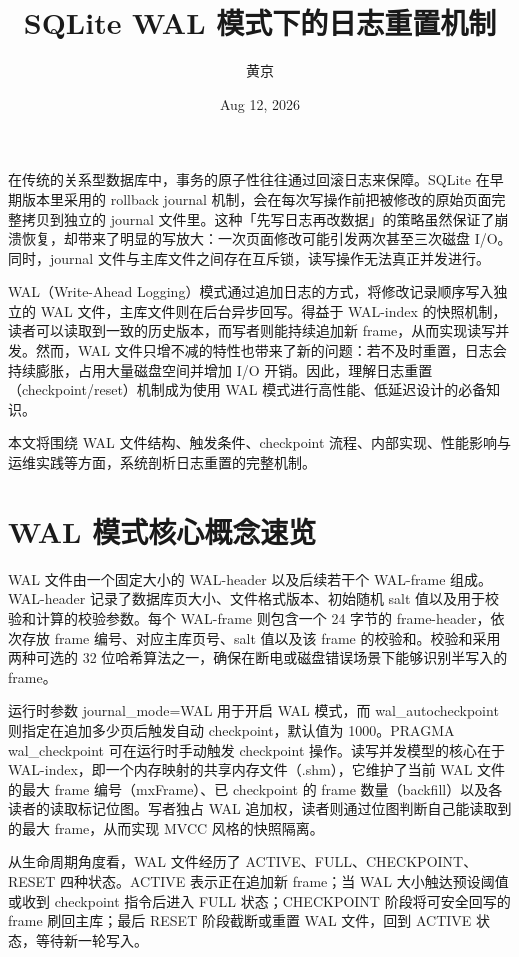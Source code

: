 \title{SQLite WAL 模式下的日志重置机制}
\author{黄京}
\date{Aug 12, 2026}
\maketitle
在传统的关系型数据库中，事务的原子性往往通过回滚日志来保障。SQLite 在早期版本里采用的 rollback journal 机制，会在每次写操作前把被修改的原始页面完整拷贝到独立的 journal 文件里。这种「先写日志再改数据」的策略虽然保证了崩溃恢复，却带来了明显的写放大：一次页面修改可能引发两次甚至三次磁盘 I/O。同时，journal 文件与主库文件之间存在互斥锁，读写操作无法真正并发进行。\par
WAL（Write-Ahead Logging）模式通过追加日志的方式，将修改记录顺序写入独立的 WAL 文件，主库文件则在后台异步回写。得益于 WAL-index 的快照机制，读者可以读取到一致的历史版本，而写者则能持续追加新 frame，从而实现读写并发。然而，WAL 文件只增不减的特性也带来了新的问题：若不及时重置，日志会持续膨胀，占用大量磁盘空间并增加 I/O 开销。因此，理解日志重置（checkpoint/reset）机制成为使用 WAL 模式进行高性能、低延迟设计的必备知识。\par
本文将围绕 WAL 文件结构、触发条件、checkpoint 流程、内部实现、性能影响与运维实践等方面，系统剖析日志重置的完整机制。\par
\chapter{WAL 模式核心概念速览}
WAL 文件由一个固定大小的 WAL-header 以及后续若干个 WAL-frame 组成。WAL-header 记录了数据库页大小、文件格式版本、初始随机 salt 值以及用于校验和计算的校验参数。每个 WAL-frame 则包含一个 24 字节的 frame-header，依次存放 frame 编号、对应主库页号、salt 值以及该 frame 的校验和。校验和采用两种可选的 32 位哈希算法之一，确保在断电或磁盘错误场景下能够识别半写入的 frame。\par
运行时参数 journal\_{}mode=WAL 用于开启 WAL 模式，而 wal\_{}autocheckpoint 则指定在追加多少页后触发自动 checkpoint，默认值为 1000。PRAGMA wal\_{}checkpoint 可在运行时手动触发 checkpoint 操作。读写并发模型的核心在于 WAL-index，即一个内存映射的共享内存文件（.shm），它维护了当前 WAL 文件的最大 frame 编号（mxFrame）、已 checkpoint 的 frame 数量（backfill）以及各读者的读取标记位图。写者独占 WAL 追加权，读者则通过位图判断自己能读取到的最大 frame，从而实现 MVCC 风格的快照隔离。\par
从生命周期角度看，WAL 文件经历了 ACTIVE、FULL、CHECKPOINT、RESET 四种状态。ACTIVE 表示正在追加新 frame；当 WAL 大小触达预设阈值或收到 checkpoint 指令后进入 FULL 状态；CHECKPOINT 阶段将可安全回写的 frame 刷回主库；最后 RESET 阶段截断或重置 WAL 文件，回到 ACTIVE 状态，等待新一轮写入。\par

